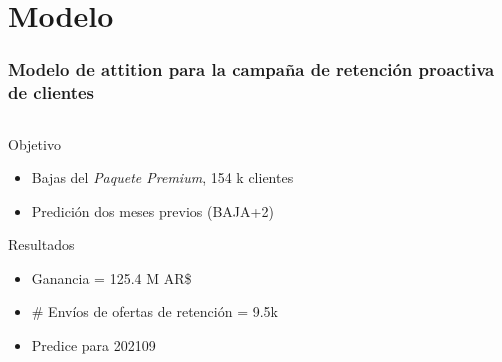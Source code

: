 \documentclass[aspectratio=169]{beamer} %
\begin{document}
\section{Modelo}

\begin{frame}
  \frametitle{Modelo de attition para la campaña de retención proactiva de clientes}
  \begin{columns}[onlytextwidth]
    \begin{column}{.6\textwidth}
      \begin{block}{Objetivo}
        \begin{itemize}
          \item Bajas del \emph{Paquete Premium}, 154 k clientes
          \item Predición dos meses previos (BAJA+2)
		    \end{itemize}
      \end{block}
 
      \begin{block}{Resultados}
        \begin{itemize}
			    \item Ganancia = 125.4 M AR\$
          \item \# Envíos de ofertas de retención = 9.5k 
			    \item Predice para 202109
	    \end{itemize}
      \end{block}
    \end{column}
  \end{columns}
\end{frame}
\end{document}
